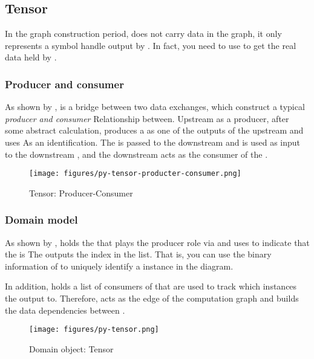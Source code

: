 \begin{content}
\subsection{Tensor}
In the graph construction period,  does not carry data in the graph, it only represents a symbol handle output by . In fact, you need to use  to get the real data held by .


\subsubsection{Producer and consumer}
As shown by ,  is a bridge between two  data exchanges, which construct a typical \emph{producer and consumer} Relationship between. Upstream  as a producer, after some abstract calculation, produces a  as one of the outputs of the upstream  and uses  As an identification. The  is passed to the downstream  and is used as input to the downstream , and the downstream  acts as the consumer of the .

\begin{figure}[H]
  \centering
  \texttt{[image: figures/py-tensor-producter-consumer.png]}
  \caption{Tensor: Producer-Consumer}
  \label{fig:py-tensor-producter-consumer}
\end{figure}


\subsubsection{Domain model}
As shown by ,  holds the  that plays the producer role via  and uses  to indicate that the  is The  outputs the index in the list. That is, you can use the binary information of  to uniquely identify a  instance in the diagram.

In addition,  holds a list of consumers of  that are used to track which  instances the  output to. Therefore,  acts as the edge of the computation graph and builds the data dependencies between .

\begin{figure}[H]
  \centering
  \texttt{[image: figures/py-tensor.png]}
  \caption{Domain object: Tensor}
  \label{fig:py-tensor}
\end{figure}



\end{content}
